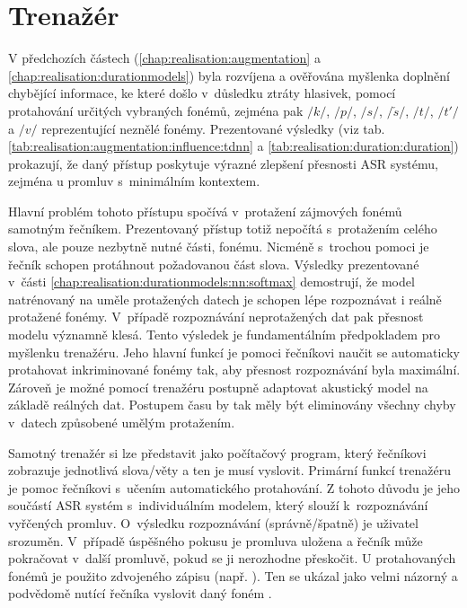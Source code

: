 \section{Trenažér}
\label{chap:realisation:trainer}

V předchozích částech (\ref{chap:realisation:augmentation} a \ref{chap:realisation:durationmodels}) byla rozvíjena a ověřována myšlenka doplnění chybějící informace, ke které došlo v~důsledku ztráty hlasivek, pomocí protahování určitých vybraných fonémů, zejména pak $/k/$, $/p/$, $/s/$, $/\check{s}/$, $/t/$, $/t'/$ a $/v/$ reprezentující neznělé fonémy. Prezentované výsledky (viz tab. \ref{tab:realisation:augmentation:influence:tdnn} a \ref{tab:realisation:duration:duration}) prokazují, že daný přístup poskytuje výrazné zlepšení přesnosti ASR systému, zejména u promluv s~minimálním kontextem.

Hlavní problém tohoto přístupu spočívá v~protažení zájmových fonémů samotným řečníkem. Prezentovaný přístup totiž nepočítá s~protažením celého slova, ale pouze nezbytně nutné části, fonému. Nicméně s~trochou pomoci je řečník schopen protáhnout požadovanou část slova. Výsledky prezentované v~části \ref{chap:realisation:durationmodels:nn:softmax} demostrují, že model natrénovaný na uměle protažených datech je schopen lépe rozpoznávat i reálně protažené fonémy. V~případě rozpoznávání neprotažených dat pak přesnost modelu významně klesá. Tento výsledek je fundamentálním předpokladem pro myšlenku trenažéru. Jeho hlavní funkcí je pomoci řečníkovi naučit se automaticky protahovat inkriminované fonémy tak, aby přesnost rozpoznávání byla maximální. Zároveň je možné pomocí trenažéru postupně adaptovat akustický model na základě reálných dat. Postupem času by tak měly být eliminovány všechny chyby v~datech způsobené umělým protažením.

Samotný trenažér si lze představit jako počítačový program, který řečníkovi zobrazuje jednotlivá slova/věty a ten je musí vyslovit. Primární funkcí trenažéru je pomoc řečníkovi s~učením automatického protahování. Z tohoto důvodu je jeho součástí ASR systém s~individuálním modelem, který slouží  k~rozpoznávání vyřčených promluv. O~výsledku rozpoznávání (správně/špatně) je uživatel srozuměn. V~případě úspěšného pokusu je promluva uložena a řečník může pokračovat v~další promluvě, pokud se ji nerozhodne přeskočit. U protahovaných fonémů je použito zdvojeného zápisu (např. \textit{}). Ten se ukázal jako velmi názorný a podvědomě nutící řečníka vyslovit daný foném .


